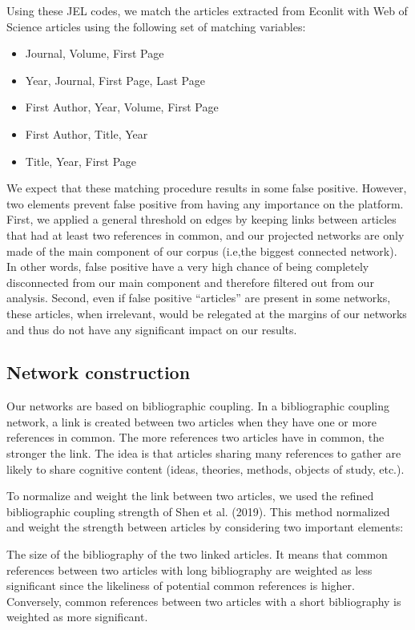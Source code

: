 \documentclass[JEL]{AEA}
\begin{document}
Using these JEL codes, we match the articles extracted from Econlit with
Web of Science articles using the following set of matching variables:

\begin{itemize}
\item
  Journal, Volume, First Page
\item
  Year, Journal, First Page, Last Page
\item
  First Author, Year, Volume, First Page
\item
  First Author, Title, Year
\item
  Title, Year, First Page
\end{itemize}

We expect that these matching procedure results in some false positive.
However, two elements prevent false positive from having any importance
on the platform. First, we applied a general threshold on edges by
keeping links between articles that had at least two references in
common, and our projected networks are only made of the main component
of our corpus (i.e,the biggest connected network). In other words, false
positive have a very high chance of being completely disconnected from
our main component and therefore filtered out from our analysis. Second,
even if false positive ``articles'' are present in some networks, these
articles, when irrelevant, would be relegated at the margins of our
networks and thus do not have any significant impact on our results.

\subsection{Network construction}

Our networks are based on bibliographic coupling. In a bibliographic
coupling network, a link is created between two articles when they have
one or more references in common. The more references two articles have
in common, the stronger the link. The idea is that articles sharing many
references to gather are likely to share cognitive content (ideas,
theories, methods, objects of study, etc.).

To normalize and weight the link between two articles, we used the
refined bibliographic coupling strength of Shen et al. (2019). This
method normalized and weight the strength between articles by
considering two important elements:

The size of the bibliography of the two linked articles. It means that
common references between two articles with long bibliography are
weighted as less significant since the likeliness of potential common
references is higher. Conversely, common references between two articles
with a short bibliography is weighted as more significant.
\end{document}
